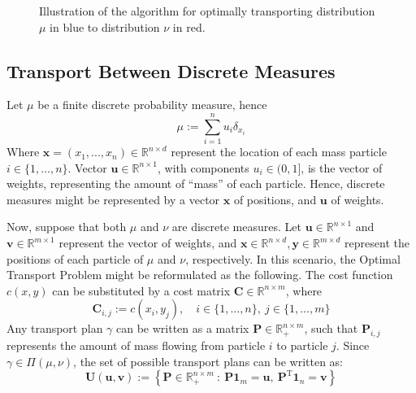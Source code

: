 \begin{figure}[H]
  \centering
  \def\svgscale{0.6}
  
  \caption{Illustration of the algorithm for optimally transporting distribution $\mu$ in blue
  to distribution $\nu$ in red.}
  \label{fig:ot-1d-discrete}
\end{figure}

\subsection{Transport Between Discrete Measures}

Let $\mu$ be a finite discrete probability measure, hence
\begin{equation}
  \mu := \sum^n_{i=1} u_i \delta_{x_i}
\end{equation}
Where $\mathbf x = (x_1,...,x_n) \in \mathbb R^{n\times d}$
represent the location of each mass particle $i \in \{1,...,n\}$. Vector
$\mathbf u \in \mathbb R^{n\times 1}$, with components $u_i \in (0,1]$,
is the vector of weights, representing the amount of ``mass'' of each particle. Hence,
discrete measures might be represented by a vector $\mathbf x$ of positions, and
$\mathbf u$ of weights.

Now, suppose that both $\mu$ and $\nu$ are discrete measures. Let $\mathbf u \in \mathbb R^{n\times 1}$
and $\mathbf v \in \mathbb R^{m \times 1}$ represent the vector of weights, and
$\mathbf x \in \mathbb R^{n\times d}, \mathbf y\in \mathbb R^{m\times d}$ represent the positions of each particle
of $\mu$ and $\nu$, respectively.
In this scenario, the Optimal Transport Problem might be reformulated as the following.
The cost function $c(x,y)$ can be substituted by a cost matrix $\mathbf C \in \mathbb R^{n \times m}$, where
\begin{equation}
  \mathbf C_{i,j} := c(x_i,y_j), \quad i \in \{1,...,n\}, \ j \in \{1,...,m\}
\end{equation}
Any transport plan $\gamma$ can be written as a matrix $\mathbf P \in \mathbb R_+^{n\times m}$, such that
$\mathbf P_{i,j}$ represents the amount of mass flowing from particle $i$ to particle $j$. Since
$\gamma \in \Pi(\mu,\nu)$, the set of possible transport plans can be written as:
\begin{equation}
  \mathbf U(\mathbf u, \mathbf v)
  := \left\{
  \mathbf P \in \mathbb R_+^{n\times m} \ : \ \mathbf P \mathbf 1_m = \mathbf u , \
  \mathbf P^\mathrm T \mathbf 1_n = \mathbf v
  \right\}
\end{equation}

